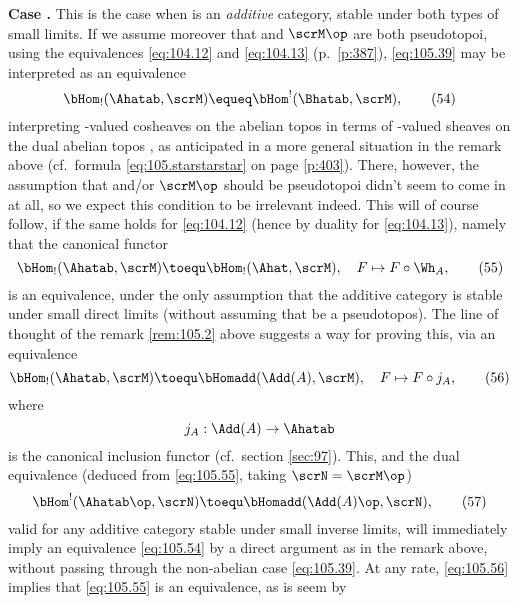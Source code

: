 \textbf{Case .}%
\enspace This is the case when \scrM{} is an \emph{additive} category,
stable under both types of small limits. If we assume moreover that
\scrM{} and $\scrM\op$ are both pseudotopoi, using the equivalences
\eqref{eq:104.12} and \eqref{eq:104.13} (p.\ \ref{p:387}),
\eqref{eq:105.39} may be interpreted as an equivalence
\begin{equation}
  \label{eq:105.54}
  \bHom_!(\Ahatab,\scrM)\equeq \bHom^!(\Bhatab,\scrM),\tag{54}
\end{equation}
interpreting \scrM-valued cosheaves on the abelian topos \Ahatab{} in
terms of \scrM-valued sheaves on the dual abelian topos \Bhatab, as
anticipated in a more general situation in the remark above (cf.\
formula \eqref{eq:105.starstarstar} on page \ref{p:403}). There,
however, the assumption that \scrM{} and/or $\scrM\op$ should be
pseudotopoi didn't seem to come in at all, so we expect this condition
to be irrelevant indeed. This will of course follow, if the same holds
for \eqref{eq:104.12} (hence by duality for \eqref{eq:104.13}), namely
that the canonical functor
\begin{equation}
  \label{eq:105.55}
  \bHom_!(\Ahatab,\scrM)\toequ\bHom_!(\Ahat,\scrM), \quad
  F\mapsto F\circ\Wh_A,\tag{55}
\end{equation}
is an equivalence, under the only assumption that the additive
category \scrM{} is stable under small direct limits (without assuming
that \scrM{} be a pseudotopos). The line of thought of the remark
\ref{rem:105.2} above suggests a way for proving this, via an
equivalence
\begin{equation}
  \label{eq:105.56}
  \bHom_!(\Ahatab,\scrM)\toequ\bHomadd(\Add(A),\scrM), \quad
  F\mapsto F\circ j_A,\tag{56}
\end{equation}
where
\[j_A: \Add(A)\to\Ahatab\]
is the canonical inclusion functor (cf.\ section \ref{sec:97}). This,
and the dual equivalence (deduced from \eqref{eq:105.55}, taking
$\scrN=\scrM\op$)
\begin{equation}
  \label{eq:105.57}
  \bHom^!(\Ahatab\op,\scrN)
  \toequ\bHomadd(\Add(A)\op,\scrN),\tag{57}
\end{equation}
valid for any additive category stable under small inverse limits,
will immediately imply an equivalence \eqref{eq:105.54} by a direct
argument as in the remark above, without passing through the
non-abelian case \eqref{eq:105.39}. At any rate, \eqref{eq:105.56}
implies that \eqref{eq:105.55} is an equivalence, as is seem by
